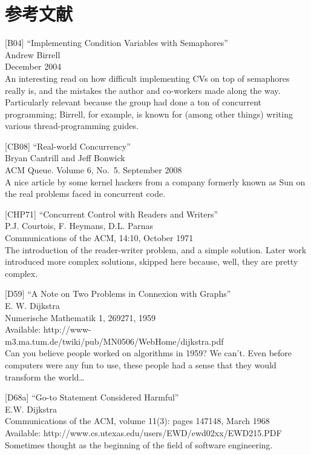 \hypertarget{ux53c2ux8003ux6587ux732e-20}{%
\section*{参考文献}\label{ux53c2ux8003ux6587ux732e-20}}

{[}B04{]} ``Implementing Condition Variables with Semaphores''\\
Andrew Birrell\\
December 2004\\
An interesting read on how difficult implementing CVs on top of
semaphores really is, and the mistakes the author and co-workers made
along the way. Particularly relevant because the group had done a ton of
concurrent programming; Birrell, for example, is known for (among other
things) writing various thread-programming guides.

{[}CB08{]} ``Real-world Concurrency''\\
Bryan Cantrill and Jeff Bonwick\\
ACM Queue. Volume 6, No.~5. September 2008\\
A nice article by some kernel hackers from a company formerly known as
Sun on the real problems faced in concurrent code.

{[}CHP71{]} ``Concurrent Control with Readers and Writers''\\
P.J. Courtois, F. Heymans, D.L. Parnas\\
Communications of the ACM, 14:10, October 1971\\
The introduction of the reader-writer problem, and a simple solution.
Later work introduced more complex solutions, skipped here because,
well, they are pretty complex.

{[}D59{]} ``A Note on Two Problems in Connexion with Graphs''\\
E. W. Dijkstra\\
Numerische Mathematik 1, 269271, 1959\\
Available:
http://www-m3.ma.tum.de/twiki/pub/MN0506/WebHome/dijkstra.pdf\\
Can you believe people worked on algorithms in 1959? We can't. Even
before computers were any fun to use, these people had a sense that they
would transform the world\ldots{}

{[}D68a{]} ``Go-to Statement Considered Harmful''\\
E.W. Dijkstra\\
Communications of the ACM, volume 11(3): pages 147148, March 1968\\
Available: http://www.cs.utexas.edu/users/EWD/ewd02xx/EWD215.PDF\\
Sometimes thought as the beginning of the field of software engineering.


